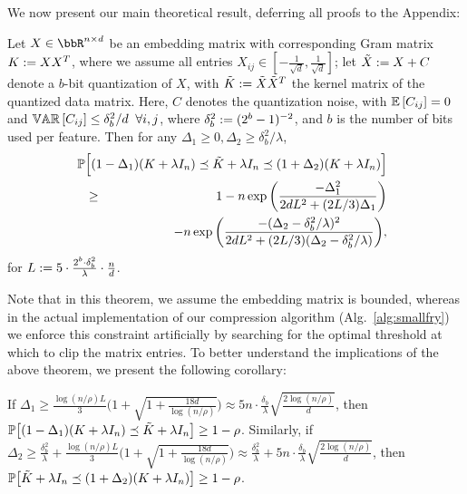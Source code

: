 We now present our main theoretical result, deferring all proofs to the Appendix:
\begin{theorem}
	\label{thm:main}
	Let $X \in \RR^{n\times d}$ be an embedding matrix with corresponding Gram matrix $K \defeq XX^T$, where we assume all entries $X_{ij} \in [-\frac{1}{\sqrt{d}},\frac{1}{\sqrt{d}}]$; let $\tX\defeq X+C$ denote a $b$-bit quantization of $X$, with $\tK \defeq \tX\tX^T$ the kernel matrix of the quantized data matrix. Here, $C$ denotes the quantization noise, with $\expect{}{C_{ij}} = 0$ and $\var{}{C_{ij}} \leq \delta_b^2/d \;\;\forall i,j$, where $\delta_b^2 \defeq (2^b-1)^{-2}$, and $b$ is the number of bits used per feature.
	Then for any $\Delta_1 \geq 0, \Delta_2 \geq \delta^2_b/\lambda$,
	\begin{eqnarray*}
	&&\hspace{-0.37in}\Prob\Big[(1- \Delta_1) (K + \lambda I_n) \preceq \tK + \lambda I_n \preceq (1 + \Delta_2) (K + \lambda I_n)
	\Big] 
	\\ &\geq& 1 - 
	n \exp \bigg(\frac{-\Delta_1^2}{2dL^2 + (2L/3)\Delta_1}\bigg) \\
	&&- n \exp \bigg(\frac{-(\Delta_2-\delta_b^2/\lambda)^2}{2dL^2 + (2L/3)(\Delta_2-\delta_b^2/\lambda)}\bigg),
	\end{eqnarray*}
	for $L \defeq 5 \cdot \frac{2^b \cdot \delta_b^2}{\lambda}\cdot \frac{n}{d}$.
\end{theorem}
Note that in this theorem, we assume the embedding matrix is bounded, whereas in the actual implementation of our compression algorithm (Alg.~\ref{alg:smallfry}) we enforce this constraint artificially by searching for the optimal threshold at which to clip the matrix entries.
To better understand the implications of the above theorem, we present the following corollary:
\begin{corollary}
	\label{cor:main}
	If $\Delta_1 \geq \frac{\log(n/\rho)L}{3}\Big(1+\sqrt{1+\frac{18d}{\log(n/\rho)}}\Big) \approx 5n\cdot \frac{\delta_b}{\lambda}\sqrt{\frac{2\log(n/\rho)}{d}}$,
	then $\Prob\big[(1 - \Delta_1) (K + \lambda I_n) \preceq \tK + \lambda I_n \big] \geq  1 - \rho$. 
	Similarly, if $\Delta_2 \geq \frac{\delta_b^2}{\lambda} +  \frac{\log(n/\rho)L}{3}\Big(1+\sqrt{1+\frac{18d}{\log(n/\rho)}}\Big) \approx \frac{\delta_b^2}{\lambda} + 5n\cdot \frac{\delta_b}{\lambda}\sqrt{\frac{2\log(n/\rho)}{d}}$,
	then $\Prob\big[\tK + \lambda I_n \preceq (1 + \Delta_2) (K + \lambda I_n)\big] \geq  1 - \rho$. 
\end{corollary}

